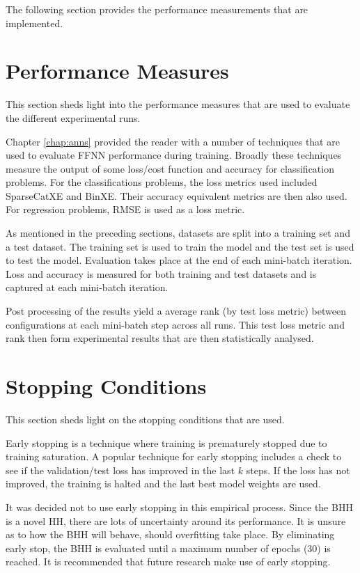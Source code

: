 The following section provides the performance measurements that are implemented.


\section{Performance Measures}\label{sec:methodology:performance_measures}

This section sheds light into the performance measures that are used to evaluate the different experimental runs.

Chapter \ref{chap:anns} provided the reader with a number of techniques that are used to evaluate \ac{FFNN} performance during training. Broadly these techniques measure the output of some loss/cost function and accuracy for classification problems. For the classifications problems, the loss metrics used included \ac{SparseCatXE} and \ac{BinXE}. Their accuracy equivalent metrics are then also used. For regression problems, \ac{RMSE} is used as a loss metric.

As mentioned in the preceding sections, datasets are split into a training set and a test dataset. The training set is used to train the model and the test set is used to test the model. Evaluation takes place at the end of each mini-batch iteration. Loss and accuracy is measured for both training and test datasets and is captured at each mini-batch iteration.

Post processing of the results yield a average rank (by test loss metric) between configurations at each mini-batch step across all runs. This test loss metric and rank then form experimental results that are then statistically analysed.

\section{Stopping Conditions}
\label{sec:methodology:stopping_conditions}

This section sheds light on the stopping conditions that are used.

Early stopping is a technique where training is prematurely stopped due to training saturation. A popular technique for early stopping includes a check to see if the validation/test loss has improved in the last $k$ steps. If the loss has not improved, the training is halted and the last best model weights are used.

It was decided not to use early stopping in this empirical process. Since the \ac{BHH} is a novel \ac{HH}, there are lots of uncertainty around its performance. It is unsure as to how the \ac{BHH} will behave, should overfitting take place. By eliminating early stop, the \ac{BHH} is evaluated until a maximum number of epochs (30) is reached. It is recommended that future research make use of early stopping.

